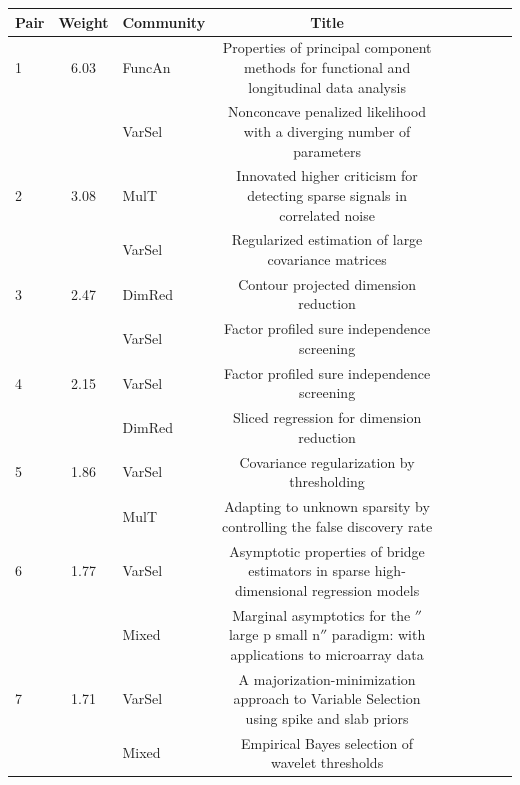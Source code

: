 \documentclass[AMS,STIX1COL]{WileyNJD-v2}
\begin{document}
\begin{landscape}
\begin{table}[t]
\begin{tabular}{lclclclcl}\hline

Pair & Weight & Community & Title                                                                                  & \\\hline
1    & 6.03                      & FuncAn    & Properties of principal component methods for functional and longitudinal data analysis       & \\
     &                           & VarSel    & Nonconcave penalized likelihood with a diverging number of parameters                         & \\
2    & 3.08                      & MulT      & Innovated higher criticism for detecting sparse signals in correlated noise                   & \\
     &                           & VarSel    & Regularized estimation of large covariance matrices & \\
3    & 2.47                      & DimRed    & Contour projected dimension reduction & \\
     &                           & VarSel    & Factor profiled sure independence screening & \\
4    & 2.15                      & VarSel    & Factor profiled sure independence screening & \\
     &                           & DimRed    & Sliced regression for dimension reduction & \\
5    & 1.86                      & VarSel    & Covariance regularization by thresholding & \\
     &                           & MulT      & Adapting to unknown sparsity by controlling the false discovery rate                          & \\
6    & 1.77                      & VarSel    & Asymptotic properties of bridge estimators in sparse high-dimensional regression models       & \\
     &                           & Mixed     & Marginal asymptotics for the $''$large p small n$''$ paradigm: with applications to microarray data &  \\
7    & 1.71                      & VarSel    & A majorization-minimization approach to Variable Selection using spike and slab priors        & \\
     &                           & Mixed     & Empirical Bayes selection of wavelet thresholds & \\

\end{tabular}
\end{table}
\end{landscape}
\end{document}
